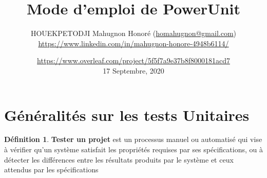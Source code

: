 \documentclass[a4paper,11pt,french]{refart}
\title{Mode d'emploi de PowerUnit}
\author{HOUEKPETODJI Mahugnon Honoré (\url{homahugnon@gmail.com})\\\url{https://www.linkedin.com/in/mahugnon-honore-4948b6114/}}
\date{\url{https://www.overleaf.com/project/5f5f7a9e37b8f8000181acd7}\\17 Septembre, 2020}
\theoremstyle{definition}
\newtheorem{definition}{Définition}[section]
\begin{document}
\maketitle



\tableofcontents
\clearpage






\section{Généralités sur les tests Unitaires}
\theoremstyle{definition}
\begin{definition}{\textbf{Tester un projet}}
 est un processus manuel ou automatisé qui vise à vérifier qu'un système satisfait les propriétés requises par ses spécifications, ou à détecter les différences entre les résultats produits par le système et ceux attendus par les spécifications
\end{definition}
\end{document}
